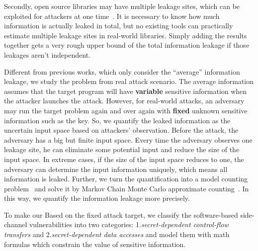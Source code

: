 Secondly, open source libraries may have multiple leakage sites, which can be exploited for attackers
at one time~\cite{191010,7163052,hornby2011side}. 
It is necessary to know how much information is actually leaked in total, 
but no existing tools can practically estimate multiple leakage sites in real-world libraries.
Simply adding the results together gets a very rough upper bound of the total information leakage if those 
leakages aren’t independent. 

Different from previous works, which only consider the
``average'' information leakage, we study the problem from real attack scenario.
The average information assumes that the target program will have \textbf{variable} sensitive 
information when the attacker launches the attack.
However, for real-world attacks, an adversary may run the target problem again and over again 
with \textbf{fixed} unknown sensitive information such as the key. 
So, we quantify the leaked information as the uncertain input space based on attackers' observation.
Before the attack, the adversary has a big but finite input space.
Every time the adversary observes one leakage site, he can eliminate some potential input and
reduce the size of the input space. 
In extreme cases, if the size of the input space reduces to one, 
the adversary can determine the input information uniquely, which means all information is leaked. 
Further, we turn the quantification into a model counting problem~\cite{bibid} 
and solve it by Markov Chain Monte Carlo approximate counting~\cite{bibid}. 
In this way, we quantify the information leakage more precisely.


To make our 
Based on the fixed attack target, we classify the software-based side-channel 
vulnerabilities into two categories: 1.\textit{secret-dependent control-flow transfers} 
and 2.\textit{secret-dependent data accesses} and model them with math formulas which
constrain the value of sensitive information.


